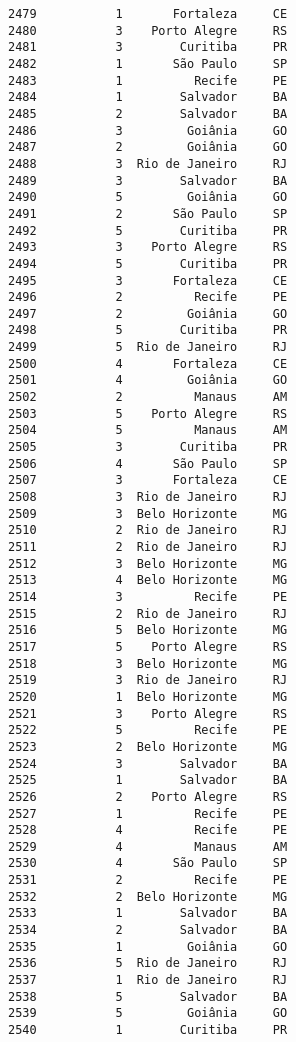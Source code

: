 \documentclass[11pt]{article}
\begin{document}
\begin{Verbatim}[commandchars=\\\{\}]
2479           1       Fortaleza     CE  
2480           3    Porto Alegre     RS  
2481           3        Curitiba     PR  
2482           1       São Paulo     SP  
2483           1          Recife     PE  
2484           1        Salvador     BA  
2485           2        Salvador     BA  
2486           3         Goiânia     GO  
2487           2         Goiânia     GO  
2488           3  Rio de Janeiro     RJ  
2489           3        Salvador     BA  
2490           5         Goiânia     GO  
2491           2       São Paulo     SP  
2492           5        Curitiba     PR  
2493           3    Porto Alegre     RS  
2494           5        Curitiba     PR  
2495           3       Fortaleza     CE  
2496           2          Recife     PE  
2497           2         Goiânia     GO  
2498           5        Curitiba     PR  
2499           5  Rio de Janeiro     RJ  
2500           4       Fortaleza     CE  
2501           4         Goiânia     GO  
2502           2          Manaus     AM  
2503           5    Porto Alegre     RS  
2504           5          Manaus     AM  
2505           3        Curitiba     PR  
2506           4       São Paulo     SP  
2507           3       Fortaleza     CE  
2508           3  Rio de Janeiro     RJ  
2509           3  Belo Horizonte     MG  
2510           2  Rio de Janeiro     RJ  
2511           2  Rio de Janeiro     RJ  
2512           3  Belo Horizonte     MG  
2513           4  Belo Horizonte     MG  
2514           3          Recife     PE  
2515           2  Rio de Janeiro     RJ  
2516           5  Belo Horizonte     MG  
2517           5    Porto Alegre     RS  
2518           3  Belo Horizonte     MG  
2519           3  Rio de Janeiro     RJ  
2520           1  Belo Horizonte     MG  
2521           3    Porto Alegre     RS  
2522           5          Recife     PE  
2523           2  Belo Horizonte     MG  
2524           3        Salvador     BA  
2525           1        Salvador     BA  
2526           2    Porto Alegre     RS  
2527           1          Recife     PE  
2528           4          Recife     PE  
2529           4          Manaus     AM  
2530           4       São Paulo     SP  
2531           2          Recife     PE  
2532           2  Belo Horizonte     MG  
2533           1        Salvador     BA  
2534           2        Salvador     BA  
2535           1         Goiânia     GO  
2536           5  Rio de Janeiro     RJ  
2537           1  Rio de Janeiro     RJ  
2538           5        Salvador     BA  
2539           5         Goiânia     GO  
2540           1        Curitiba     PR  

\end{Verbatim}
\end{document}
